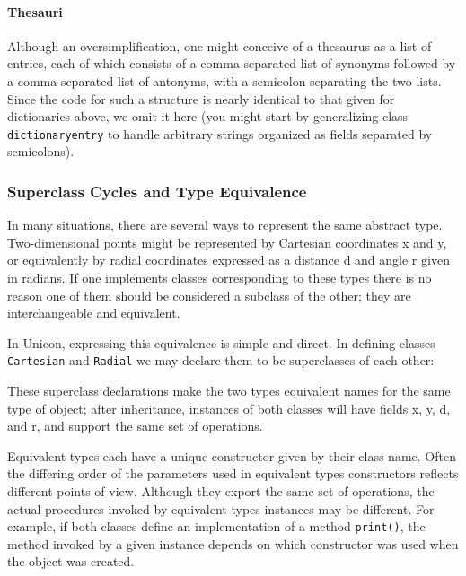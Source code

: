 \paragraph{Thesauri}
Although an oversimplification, one might conceive of a thesaurus as a
list of entries, each of which consists of a comma-separated list of
synonyms followed by a comma-separated list of antonyms, with a
semicolon separating the two lists. Since the code for such a structure
is nearly identical to that given for dictionaries above, we omit it
here (you might start by generalizing class \texttt{dictionaryentry} to
handle arbitrary strings organized as fields separated by semicolons). 

\subsubsection{Superclass Cycles and Type Equivalence}

In many situations, there are several ways to represent the same
abstract type. Two-dimensional points might be represented by
Cartesian coordinates x and y, or
equivalently by radial coordinates expressed as a distance d and angle
r given in radians. If one implements classes
corresponding to these types there is no reason one of them should be
considered a subclass of the other; they are interchangeable and
equivalent. 

In Unicon, expressing this equivalence is simple and direct. In defining
classes \texttt{Cartesian} and \texttt{Radial} we may declare them to
be superclasses of each other: 


These superclass declarations make the two types equivalent names for
the same type of object; after inheritance,
instances of both classes will
have fields x, y, d, and r, and support the same set of operations. 

Equivalent types each have a unique constructor
given by their class name. Often the differing order of the parameters
used in equivalent types{\textquotesingle} constructors reflects
different points of view. Although they export the same set of
operations, the actual procedures invoked by equivalent
types{\textquotesingle} instances may be different. For example, if
both classes define an implementation of a method \texttt{print()}, the
method invoked by a given instance depends on which constructor was
used when the object was created.

